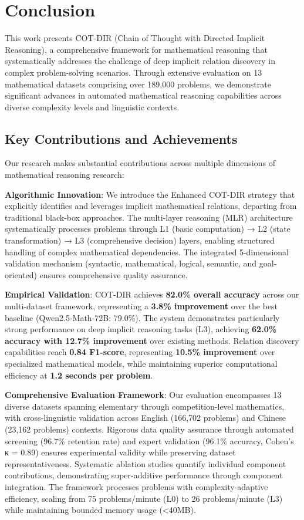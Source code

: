 \section{Conclusion}
\label{sec:conclusion}

This work presents COT-DIR (Chain of Thought with Directed Implicit Reasoning), a comprehensive framework for mathematical reasoning that systematically addresses the challenge of deep implicit relation discovery in complex problem-solving scenarios. Through extensive evaluation on 13 mathematical datasets comprising over 189,000 problems, we demonstrate significant advances in automated mathematical reasoning capabilities across diverse complexity levels and linguistic contexts.

\subsection{Key Contributions and Achievements}

Our research makes substantial contributions across multiple dimensions of mathematical reasoning research:

\textbf{Algorithmic Innovation}: We introduce the Enhanced COT-DIR strategy that explicitly identifies and leverages implicit mathematical relations, departing from traditional black-box approaches. The multi-layer reasoning (MLR) architecture systematically processes problems through L1 (basic computation) → L2 (state transformation) → L3 (comprehensive decision) layers, enabling structured handling of complex mathematical dependencies. The integrated 5-dimensional validation mechanism (syntactic, mathematical, logical, semantic, and goal-oriented) ensures comprehensive quality assurance.

\textbf{Empirical Validation}: COT-DIR achieves \textbf{82.0\% overall accuracy} across our multi-dataset framework, representing a \textbf{3.8\% improvement} over the best baseline (Qwen2.5-Math-72B: 79.0\%). The system demonstrates particularly strong performance on deep implicit reasoning tasks (L3), achieving \textbf{62.0\% accuracy with 12.7\% improvement} over existing methods. Relation discovery capabilities reach \textbf{0.84 F1-score}, representing \textbf{10.5\% improvement} over specialized mathematical models, while maintaining superior computational efficiency at \textbf{1.2 seconds per problem}.

\textbf{Comprehensive Evaluation Framework}: Our evaluation encompasses 13 diverse datasets spanning elementary through competition-level mathematics, with cross-linguistic validation across English (166,702 problems) and Chinese (23,162 problems) contexts. Rigorous data quality assurance through automated screening (96.7\% retention rate) and expert validation (96.1\% accuracy, Cohen's κ = 0.89) ensures experimental validity while preserving dataset representativeness. Systematic ablation studies quantify individual component contributions, demonstrating super-additive performance through component integration. The framework processes problems with complexity-adaptive efficiency, scaling from 75 problems/minute (L0) to 26 problems/minute (L3) while maintaining bounded memory usage (<40MB).

